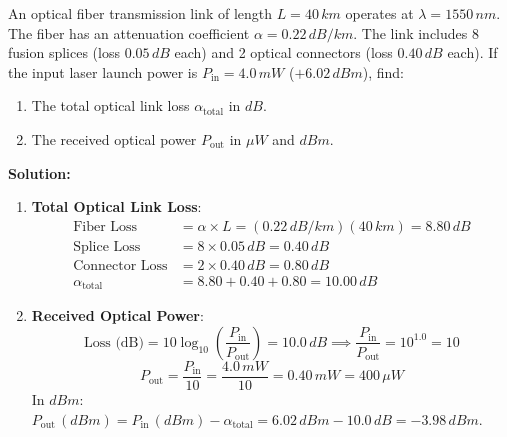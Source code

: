 \begin{example}
An optical fiber transmission link of length $L = 40\,\si{km}$ operates at $\lambda = 1550\,\si{nm}$. The fiber has an attenuation coefficient $\alpha = 0.22\,\si{dB/km}$. The link includes 8 fusion splices (loss $0.05\,\si{dB}$ each) and 2 optical connectors (loss $0.40\,\si{dB}$ each). If the input laser launch power is $P_{\text{in}} = 4.0\,\si{mW}$ ($+6.02\,\si{dBm}$), find:
\begin{enumerate}
    \item The total optical link loss $\alpha_{\text{total}}$ in $\si{dB}$.
    \item The received optical power $P_{\text{out}}$ in $\si{\mu W}$ and $\si{dBm}$.
\end{enumerate}

\textbf{Solution:}
\begin{enumerate}
    \item \textbf{Total Optical Link Loss}:
    \begin{align*}
        \text{Fiber Loss} &= \alpha \times L = (0.22\,\si{dB/km})(40\,\si{km}) = 8.80\,\si{dB} \\
        \text{Splice Loss} &= 8 \times 0.05\,\si{dB} = 0.40\,\si{dB} \\
        \text{Connector Loss} &= 2 \times 0.40\,\si{dB} = 0.80\,\si{dB} \\
        \alpha_{\text{total}} &= 8.80 + 0.40 + 0.80 = 10.00\,\si{dB}
    \end{align*}
    
    \item \textbf{Received Optical Power}:
    \begin{equation*}
        \text{Loss (dB)} = 10 \log_{10}\left(\frac{P_{\text{in}}}{P_{\text{out}}}\right) = 10.0\,\si{dB} \implies \frac{P_{\text{in}}}{P_{\text{out}}} = 10^{1.0} = 10
    \end{equation*}
    \begin{equation*}
        P_{\text{out}} = \frac{P_{\text{in}}}{10} = \frac{4.0\,\si{mW}}{10} = 0.40\,\si{mW} = 400\,\si{\mu W}
    \end{equation*}
    In $\si{dBm}$: $P_{\text{out}}\,(\si{dBm}) = P_{\text{in}}\,(\si{dBm}) - \alpha_{\text{total}} = 6.02\,\si{dBm} - 10.0\,\si{dB} = -3.98\,\si{dBm}$.
\end{enumerate}
\end{example}

